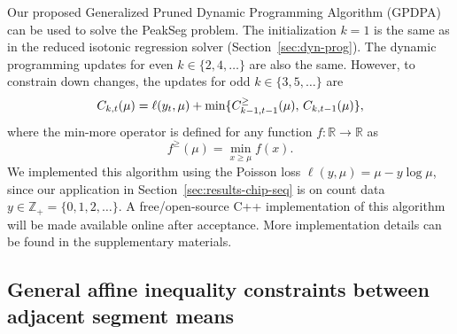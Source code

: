 \documentclass{article}
\newcommand{\ZZ}{\mathbb Z}
\newcommand{\RR}{\mathbb R}
\begin{document}
Our proposed Generalized Pruned Dynamic Programming Algorithm (GPDPA)
can be used to solve the PeakSeg problem. The initialization $k=1$ is
the same as in the reduced isotonic regression solver
(Section~\ref{sec:dyn-prog}). The dynamic programming updates for even
$k\in\{2, 4, \dots\}$ are also the same. However, to constrain down
changes, the updates for odd $k\in\{3, 5, \dots\}$ are
\begin{equation}
  C_{k,t}(\mu) = \ell(y_t, \mu) + \min\{
  C_{k-1,t-1}^\geq(\mu),\, C_{k,t-1}(\mu)
  \},
\end{equation}
where the min-more operator is defined for any function $f:\RR\rightarrow\RR$ as
\begin{equation}
  \label{eq:min-more-def}
  f^\geq(\mu) = \min_{x\geq \mu} f(x).
\end{equation}
We implemented this algorithm using the Poisson loss
$\ell(y, \mu) = \mu - y\log \mu$, since our application in
Section~\ref{sec:results-chip-seq} is on count data
$y\in\ZZ_+ = \{0, 1, 2, \dots\}$.
A free/open-source C++ implementation of this algorithm will be made
available online after acceptance. More implementation details can be
found in the supplementary materials.

\subsection{General affine inequality constraints
  between adjacent segment means}
\label{sec:general}


\end{document}
